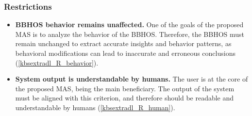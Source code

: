 \subsubsection*{Restrictions}
\begin{itemize}
    \item \textbf{BBHOS behavior remains unaffected.} One of the goals of the proposed MAS is to analyze the behavior of the BBHOS. Therefore, the BBHOS must remain unchanged to extract accurate insights and behavior patterns, as behavioral modifications can lead to inaccurate and erroneous conclusions (\ref{kbsextradl_R_behavior}).
    
    \item \textbf{System output is understandable by humans.} The user is at the core of the proposed MAS, being the main beneficiary. The output of the system must be aligned with this criterion, and therefore should be readable and understandable by humans (\ref{kbsextradl_R_human}).
\end{itemize}

